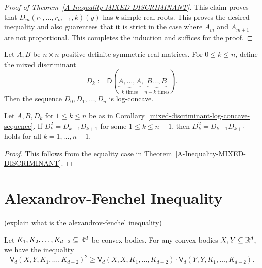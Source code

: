 \documentclass{puthesis-UG}
\begin{document}
\begin{proof}[Proof of Theorem~\ref{A-Inequality-MIXED-DISCRIMINANT}]
	This claim proves that $D_m(r_1, \ldots, r_{m-1}, k)(y)$ has $k$ simple real roots. This proves the desired inequality and also guarentees that it is strict in the case where $A_m$ and $A_{m+1}$ are not proportional. This completes the induction and suffices for the proof. 
\end{proof}


\begin{cor} \label{mixed-discriminant-log-concave-sequence}
	Let $A, B$ be $n \times n$ positive definite symmetric real matrices. For $0 \leq k \leq n$, define the mixed discriminant
	\[
		D_k := \mathsf{D} (\underbrace{A, \ldots, A}_{k \text{ times}}, \underbrace{B \ldots, B}_{n-k \text{ times}}).
	\]
	Then the sequence $D_0, D_1, \ldots, D_n$ is log-concave. 
\end{cor}

\begin{cor}
	Let $A, B, D_k$ for $1 \leq k \leq n$ be as in Corollary~\ref{mixed-discriminant-log-concave-sequence}. If $D_k^2 = D_{k-1}D_{k+1}$ for some $1 \leq k \leq n-1$, then $D_k^2 = D_{k-1} D_{k+1}$ holds for all $k = 1, \ldots, n-1$. 
\end{cor}

\begin{proof}
	This follows from the equality case in Theorem~\ref{A-Inequality-MIXED-DISCRIMINANT}. 
\end{proof}
\section{Alexandrov-Fenchel Inequality}

(explain what is the alexandrov-fenchel inequality)

\begin{thm} \label{AF-inequality}
	Let $K_1, K_2, \ldots, K_{d-2} \subseteq \mathbb{R}^d$ be convex bodies. For any convex bodies $X, Y \subseteq \mathbb{R}^d$, we have the inequality
	\[
		\mathsf{V}_d(X, Y, K_1, \ldots, K_{d-2})^2 \geq \mathsf{V}_d(X, X, K_1, \ldots, K_{d-2}) \cdot \mathsf{V}_d(Y, Y, K_1, \ldots, K_{d-2}). 
	\]
\end{thm}
\end{document}
